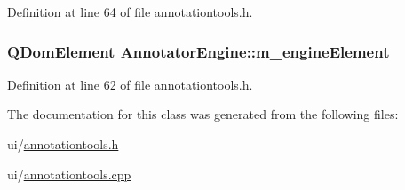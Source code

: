 Definition at line 64 of file annotationtools.\+h.

\hypertarget{classAnnotatorEngine_aa60b9dda9bd0beb5af6f777b1e65b342}{
\subsubsection[{m\+\_\+engine\+Element}]{\setlength{\rightskip}{0pt plus 5cm}Q\+Dom\+Element Annotator\+Engine\+::m\+\_\+engine\+Element\hspace{0.3cm}{\ttfamily [protected]}}}\label{classAnnotatorEngine_aa60b9dda9bd0beb5af6f777b1e65b342}


Definition at line 62 of file annotationtools.\+h.



The documentation for this class was generated from the following files\+:\begin{DoxyCompactItemize}
\item 
ui/\hyperlink{annotationtools_8h}{annotationtools.\+h}\item 
ui/\hyperlink{annotationtools_8cpp}{annotationtools.\+cpp}\end{DoxyCompactItemize}
